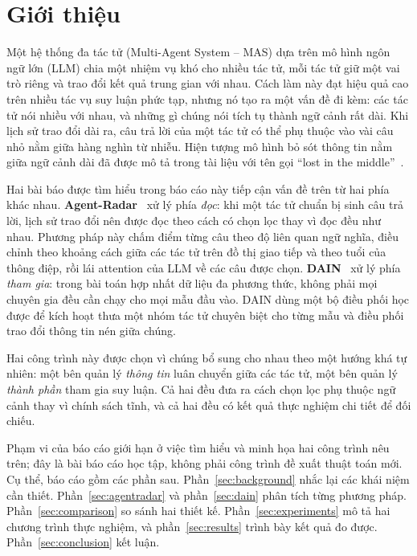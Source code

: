 \section{Giới thiệu}

Một hệ thống đa tác tử (Multi-Agent System -- MAS) dựa trên mô hình ngôn ngữ lớn (LLM) chia một nhiệm vụ khó cho nhiều tác tử, mỗi tác tử giữ một vai trò riêng và trao đổi kết quả trung gian với nhau. Cách làm này đạt hiệu quả cao trên nhiều tác vụ suy luận phức tạp, nhưng nó tạo ra một vấn đề đi kèm: các tác tử nói nhiều với nhau, và những gì chúng nói tích tụ thành ngữ cảnh rất dài. Khi lịch sử trao đổi dài ra, câu trả lời của một tác tử có thể phụ thuộc vào vài câu nhỏ nằm giữa hàng nghìn từ nhiễu. Hiện tượng mô hình bỏ sót thông tin nằm giữa ngữ cảnh dài đã được mô tả trong tài liệu với tên gọi ``lost in the middle''~\cite{liu2024lost}.

Hai bài báo được tìm hiểu trong báo cáo này tiếp cận vấn đề trên từ hai phía khác nhau. \textbf{Agent-Radar}~\cite{agentradar2026} xử lý phía \emph{đọc}: khi một tác tử chuẩn bị sinh câu trả lời, lịch sử trao đổi nên được đọc theo cách có chọn lọc thay vì đọc đều như nhau. Phương pháp này chấm điểm từng câu theo độ liên quan ngữ nghĩa, điều chỉnh theo khoảng cách giữa các tác tử trên đồ thị giao tiếp và theo tuổi của thông điệp, rồi lái attention của LLM về các câu được chọn. \textbf{DAIN}~\cite{dain2026} xử lý phía \emph{tham gia}: trong bài toán hợp nhất dữ liệu đa phương thức, không phải mọi chuyên gia đều cần chạy cho mọi mẫu đầu vào. DAIN dùng một bộ điều phối học được để kích hoạt thưa một nhóm tác tử chuyên biệt cho từng mẫu và điều phối trao đổi thông tin nén giữa chúng.

Hai công trình này được chọn vì chúng bổ sung cho nhau theo một hướng khá tự nhiên: một bên quản lý \emph{thông tin} luân chuyển giữa các tác tử, một bên quản lý \emph{thành phần} tham gia suy luận. Cả hai đều đưa ra cách chọn lọc phụ thuộc ngữ cảnh thay vì chính sách tĩnh, và cả hai đều có kết quả thực nghiệm chi tiết để đối chiếu.

Phạm vi của báo cáo giới hạn ở việc tìm hiểu và minh họa hai công trình nêu trên; đây là bài báo cáo học tập, không phải công trình đề xuất thuật toán mới. Cụ thể, báo cáo gồm các phần sau. Phần~\ref{sec:background} nhắc lại các khái niệm cần thiết. Phần~\ref{sec:agentradar} và phần~\ref{sec:dain} phân tích từng phương pháp. Phần~\ref{sec:comparison} so sánh hai thiết kế. Phần~\ref{sec:experiments} mô tả hai chương trình thực nghiệm, và phần~\ref{sec:results} trình bày kết quả đo được. Phần~\ref{sec:conclusion} kết luận.
